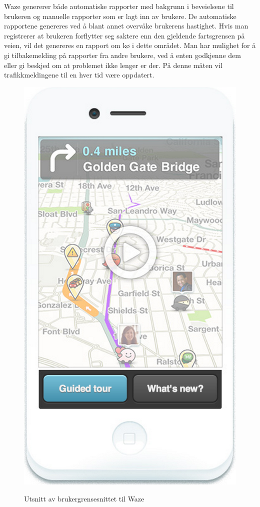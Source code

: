 \documentclass[a4paper,norsk,oneside]{book}
\begin{document}
Waze genererer både automatiske rapporter med bakgrunn i beveielsene til brukeren og manuelle rapporter som er lagt inn av brukere. De automatiske rapportene genereres ved å blant annet overvåke brukerens hastighet. Hvis man registrerer at brukeren forflytter seg saktere enn den gjeldende fartsgrensen på veien, vil det genereres en rapport om kø i dette området. Man har mulighet for å gi tilbakemelding på rapporter fra andre brukere, ved å enten godkjenne dem eller gi beskjed om at problemet ikke lenger er der. På denne måten vil trafikkmeldingene til en hver tid være oppdatert.

\begin{figure}[H]
\centering
\includegraphics[scale=0.5]{figs/waze2.png}
\label{waze1}
\caption{Utsnitt av brukergrensesnittet til Waze}
\end{figure}
\end{document}

